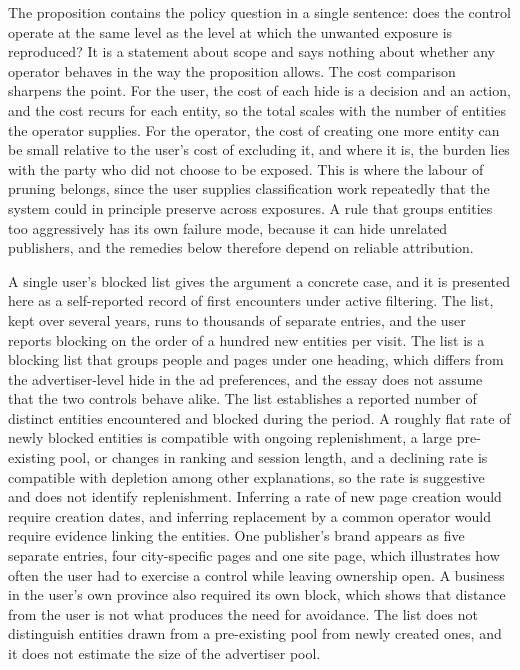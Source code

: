 \documentclass[11pt]{article}
\theoremstyle{definition}
\begin{document}
The proposition contains the policy question in a single sentence: does the control operate at the same level as the level at which the unwanted exposure is reproduced? It is a statement about scope and says nothing about whether any operator behaves in the way the proposition allows. The cost comparison sharpens the point. For the user, the cost of each hide is a decision and an action, and the cost recurs for each entity, so the total scales with the number of entities the operator supplies. For the operator, the cost of creating one more entity can be small relative to the user's cost of excluding it, and where it is, the burden lies with the party who did not choose to be exposed. This is where the labour of pruning belongs, since the user supplies classification work repeatedly that the system could in principle preserve across exposures. A rule that groups entities too aggressively has its own failure mode, because it can hide unrelated publishers, and the remedies below therefore depend on reliable attribution.

A single user's blocked list gives the argument a concrete case, and it is presented here as a self-reported record of first encounters under active filtering. The list, kept over several years, runs to thousands of separate entries, and the user reports blocking on the order of a hundred new entities per visit. The list is a blocking list that groups people and pages under one heading, which differs from the advertiser-level hide in the ad preferences, and the essay does not assume that the two controls behave alike. The list establishes a reported number of distinct entities encountered and blocked during the period. A roughly flat rate of newly blocked entities is compatible with ongoing replenishment, a large pre-existing pool, or changes in ranking and session length, and a declining rate is compatible with depletion among other explanations, so the rate is suggestive and does not identify replenishment. Inferring a rate of new page creation would require creation dates, and inferring replacement by a common operator would require evidence linking the entities. One publisher's brand appears as five separate entries, four city-specific pages and one site page, which illustrates how often the user had to exercise a control while leaving ownership open. A business in the user's own province also required its own block, which shows that distance from the user is not what produces the need for avoidance. The list does not distinguish entities drawn from a pre-existing pool from newly created ones, and it does not estimate the size of the advertiser pool.
\end{document}
